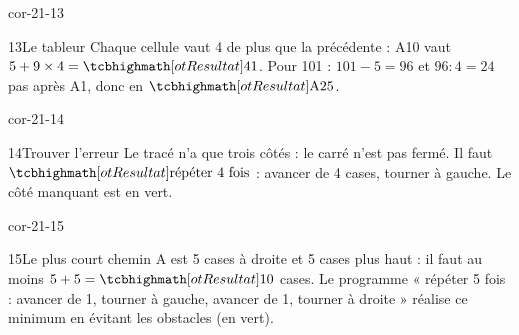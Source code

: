 \begin{blocLivre}{cor-21-13}\begin{corrige}{13}{Le tableur}
Chaque cellule vaut 4 de plus que la précédente : A10 vaut $5+9\times4=\res{41}$. Pour 101 : $101-5=96$ et $96:4=24$ pas après A1, donc en $\res{\text{A25}}$.
\end{corrige}\end{blocLivre}
\begin{blocLivre}{cor-21-14}\begin{corrige}{14}{Trouver l’erreur}
Le tracé n’a que trois côtés : le carré n’est pas fermé. Il faut $\res{\text{répéter 4 fois}}$ : avancer de 4 cases, tourner à gauche. Le côté manquant est en vert.
\label{fig-cor-21-14}
\end{corrige}\end{blocLivre}
\begin{blocLivre}{cor-21-15}\begin{corrige}{15}{Le plus court chemin}
A est 5 cases à droite et 5 cases plus haut : il faut au moins $5+5=\res{10}$ cases. Le programme « répéter 5 fois : avancer de 1, tourner à gauche, avancer de 1, tourner à droite » réalise ce minimum en évitant les obstacles (en vert).
\label{fig-cor-21-15}
\end{corrige}\end{blocLivre}
